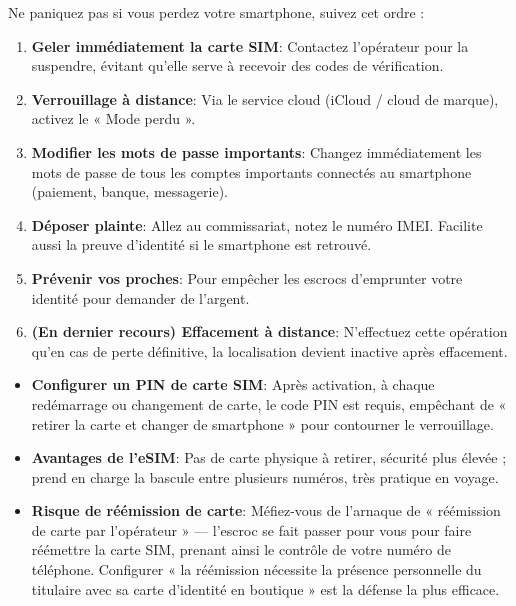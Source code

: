 
Ne paniquez pas si vous perdez votre smartphone, suivez cet ordre :

\begin{enumerate}
  \item \textbf{Geler immédiatement la carte SIM}: Contactez l'opérateur pour la suspendre, évitant qu'elle serve à recevoir des codes de vérification.
  \item \textbf{Verrouillage à distance}: Via le service cloud (iCloud / cloud de marque), activez le « Mode perdu ».
  \item \textbf{Modifier les mots de passe importants}: Changez immédiatement les mots de passe de tous les comptes importants connectés au smartphone (paiement, banque, messagerie).
  \item \textbf{Déposer plainte}: Allez au commissariat, notez le numéro IMEI. Facilite aussi la preuve d'identité si le smartphone est retrouvé.
  \item \textbf{Prévenir vos proches}: Pour empêcher les escrocs d'emprunter votre identité pour demander de l'argent.
  \item \textbf{(En dernier recours) Effacement à distance}: N'effectuez cette opération qu'en cas de perte définitive, la localisation devient inactive après effacement.
\end{enumerate}


\begin{itemize}
  \item \textbf{Configurer un PIN de carte SIM}: Après activation, à chaque redémarrage ou changement de carte, le code PIN est requis, empêchant de « retirer la carte et changer de smartphone » pour contourner le verrouillage.
  \item \textbf{Avantages de l'eSIM}: Pas de carte physique à retirer, sécurité plus élevée ; prend en charge la bascule entre plusieurs numéros, très pratique en voyage.
  \item \textbf{Risque de réémission de carte}: Méfiez-vous de l'arnaque de « réémission de carte par l'opérateur » — l'escroc se fait passer pour vous pour faire réémettre la carte SIM, prenant ainsi le contrôle de votre numéro de téléphone. Configurer « la réémission nécessite la présence personnelle du titulaire avec sa carte d'identité en boutique » est la défense la plus efficace.
\end{itemize}

